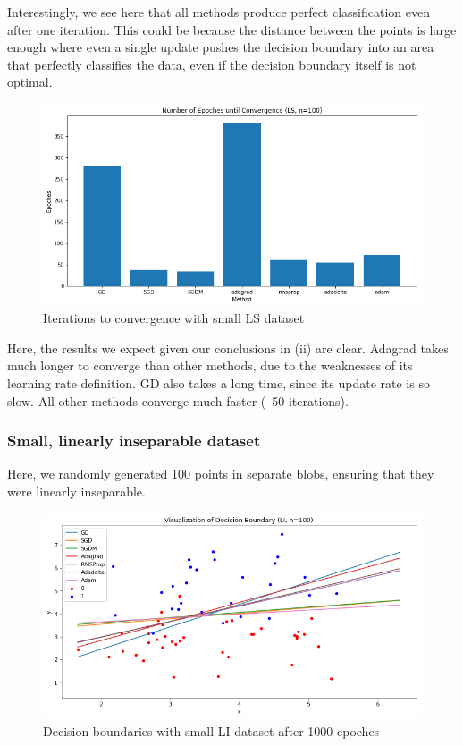 \documentclass[twoside,11pt]{homework}
\begin{document}
Interestingly, we see here that all methods produce perfect classification even after one iteration. This could be because the distance between the points is large enough where even a single update pushes the decision boundary into an area that perfectly classifies the data, even if the decision boundary itself is not optimal.


\begin{figure}[H]
		\centering
		\includegraphics[scale=.5]{q5/sep_100/time.png}
		\caption{Iterations to convergence with small LS dataset}
	\end{figure}

Here, the results we expect given our conclusions in (ii) are clear. Adagrad takes much longer to converge than other methods, due to the weaknesses of its learning rate definition. GD also takes a long time, since its update rate is so slow. All other methods converge much faster (~50 iterations).


\subsubsection{Small, linearly inseparable dataset}
Here, we randomly generated 100 points in separate blobs, ensuring that they were linearly inseparable.
\begin{figure}[H]
		\centering
		\includegraphics[scale=.5]{q5/insep_100/lines.png}
		\caption{Decision boundaries with small LI dataset after 1000 epoches}
	\end{figure}
\end{document}
